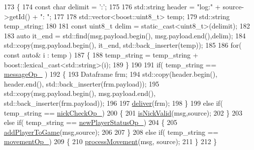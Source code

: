 \begin{DoxyCode}
173     \{
174         \textcolor{keyword}{const} \textcolor{keywordtype}{char} delimit = \textcolor{charliteral}{':'};
175 
176         std::string header = \textcolor{stringliteral}{"log:"} + source->getId() + \textcolor{stringliteral}{": "};
177 
178         std::vector<boost::uint8\_t> temp;
179         std::string temp\_string;
180 
181         \textcolor{keyword}{const} uint8\_t delim = \textcolor{keyword}{static\_cast<}uint8\_t\textcolor{keyword}{>}(delimit);
182 
183         \textcolor{keyword}{auto} it\_end = std::find(msg.payload.begin(), msg.payload.end(),delim);
184         std::copy(msg.payload.begin(), it\_end, std::back\_inserter(temp));
185         
186         \textcolor{keywordflow}{for}( \textcolor{keyword}{const} \textcolor{keyword}{auto}& i : temp )
187         \{
188             temp\_string = temp\_string + boost::lexical\_cast<std::string>(i);
189         \}
190 
191         \textcolor{keywordflow}{if}( temp\_string == \hyperlink{classwebsocket_1_1GameBoard_a27fc2053eae7a0bdc4ec6cb7ff92502e}{messageOp\_} )
192         \{
193             Dataframe frm;
194             std::copy(header.begin(), header.end(), std::back\_inserter(frm.payload));
195             std::copy(msg.payload.begin(), msg.payload.end(), std::back\_inserter(frm.payload));
196 
197             \hyperlink{classwebsocket_1_1GameBoard_a0ed4b13ba573956d8aebaf8f5c208fa0}{deliver}(frm);
198         \}
199         \textcolor{keywordflow}{else} \textcolor{keywordflow}{if}( temp\_string == \hyperlink{classwebsocket_1_1GameBoard_a55afbbb9d15f4815427d2f20ca6674cd}{nickCheckOp\_})
200         \{
201             \hyperlink{classwebsocket_1_1GameBoard_a20af876986152e2c4db78174d186d2b6}{isNickValid}(msg,source);
202         \}
203         \textcolor{keywordflow}{else} \textcolor{keywordflow}{if}( temp\_string == \hyperlink{classwebsocket_1_1GameBoard_af28eae4479ca907c062495b7ec2925c1}{newPlayerStatusOp\_})
204         \{
205             \hyperlink{classwebsocket_1_1GameBoard_ad6da3630e77cf3da0563072e5c1ec162}{addPlayerToGame}(msg,source);
206 
207         \}
208         \textcolor{keywordflow}{else} \textcolor{keywordflow}{if}( temp\_string == \hyperlink{classwebsocket_1_1GameBoard_ac5eba2bf19bde163ea767906c8e2c61c}{movementOp\_})
209         \{
210             \hyperlink{classwebsocket_1_1GameBoard_a40aed2036d1065d0bfa24d4e84da1418}{processMovement}(msg, source);
211         \}
212     \}
\end{DoxyCode}
